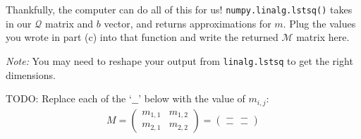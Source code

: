 \begin{enumerate}[(a)]
Thankfully, the computer can do all of this for us! \texttt{numpy.linalg.lstsq()} takes in our $\mathcal{Q}$ matrix and $b$ vector, and returns approximations for $m$. Plug the values you wrote in part (c) into that function and write the returned $\mathcal{M}$ matrix here.

\textit{Note:} You may need to reshape your output from \texttt{linalg.lstsq} to get the right dimensions.

\begin{mdframed}
TODO: Replace each of the `$\_\_$' below with the value of $m_{i, j}$:
\begin{align*}
    M = \begin{pmatrix} m_{1,1} & m_{1,2} \\ m_{2,1} & m_{2,2} \end{pmatrix} = \begin{pmatrix} \_\_ & \_\_ \\ \_\_ & \_\_ \end{pmatrix}
\end{align*}
\end{mdframed}

\end{enumerate}





\pagebreak
